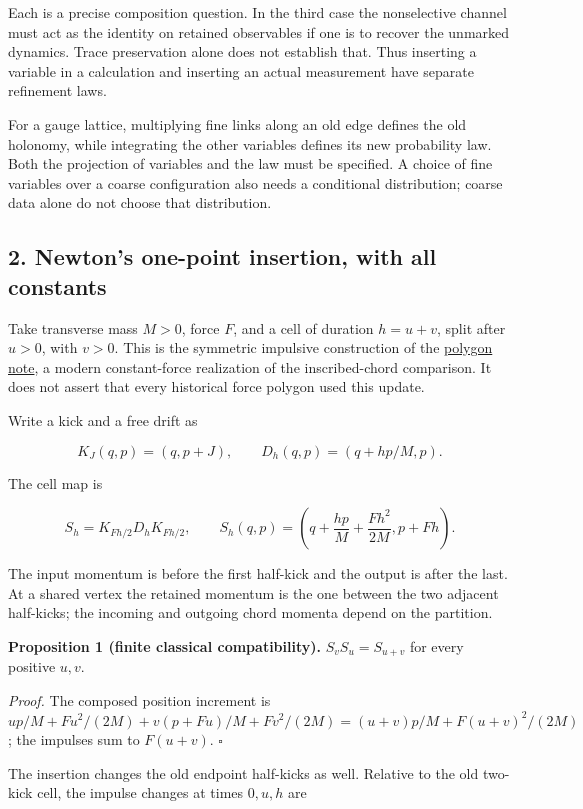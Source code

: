 \documentclass[11pt,a4paper]{article}
\begin{document}
Each is a precise composition question. In the third case the
nonselective channel must act as the identity on retained observables if
one is to recover the unmarked dynamics. Trace preservation alone does
not establish that. Thus inserting a variable in a calculation and
inserting an actual measurement have separate refinement laws.

For a gauge lattice, multiplying fine links along an old edge defines
the old holonomy, while integrating the other variables defines its new
probability law. Both the projection of variables and the law must be
specified. A choice of fine variables over a coarse configuration also
needs a conditional distribution; coarse data alone do not choose that
distribution.

\hypertarget{newtons-one-point-insertion-with-all-constants}{%
\subsection{2. Newton's one-point insertion, with all
constants}\label{newtons-one-point-insertion-with-all-constants}}

Take transverse mass \(M>0\), force \(F\), and a cell of duration
\(h=u+v\), split after \(u>0\), with \(v>0\). This is the symmetric
impulsive construction of the
\href{cut-measure-newton.md\#weyl-lifting-and-polygon-phases}{polygon
note}, a modern constant-force realization of the inscribed-chord
comparison. It does not assert that every historical force polygon used
this update.

Write a kick and a free drift as

\[K_J(q,p)=(q,p+J),\qquad D_h(q,p)=(q+hp/M,p).\]

The cell map is

\[S_h=K_{Fh/2}D_hK_{Fh/2},\qquad
S_h(q,p)=\left(q+\frac{hp}{M}+\frac{Fh^2}{2M},p+Fh\right).\]

The input momentum is before the first half-kick and the output is after
the last. At a shared vertex the retained momentum is the one between
the two adjacent half-kicks; the incoming and outgoing chord momenta
depend on the partition.

\textbf{Proposition 1 (finite classical compatibility).}
\(S_vS_u=S_{u+v}\) for every positive \(u,v\).

\emph{Proof.} The composed position increment is
\(up/M+Fu^2/(2M)+v(p+Fu)/M+Fv^2/(2M) =(u+v)p/M+F(u+v)^2/(2M)\); the
impulses sum to \(F(u+v)\). \(\square\)

The insertion changes the old endpoint half-kicks as well. Relative to
the old two-kick cell, the impulse changes at times \(0,u,h\) are
\end{document}
